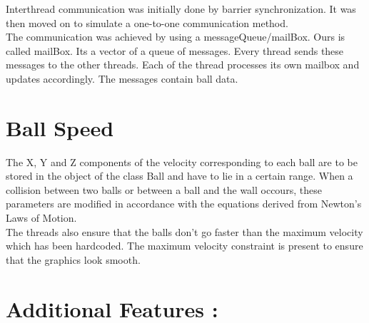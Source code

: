 \documentclass[]{article}
\begin{document}
Interthread communication was initially done by barrier synchronization. It was then moved on to simulate a one-to-one communication method. \\
The communication was achieved by using a messageQueue/mailBox. Ours is called mailBox. Its a vector of a queue of messages. Every thread sends these messages to the other threads. Each of the thread processes its own mailbox and updates accordingly. The messages contain ball data.\\


\section{Ball Speed}

\begin{flushleft}

The X, Y and Z components of the velocity corresponding to each ball are to be stored in the  object of the class Ball and have to lie in a certain range. When a collision between two balls or between a ball and the wall occours, these parameters are modified in accordance with the equations derived from Newton's Laws of Motion.  
\\
The threads also ensure that the balls don't go faster than the maximum velocity which has been hardcoded. The maximum velocity constraint is present to ensure that the graphics look smooth.

\end{flushleft}

\section{Additional Features :}
\end{document}
